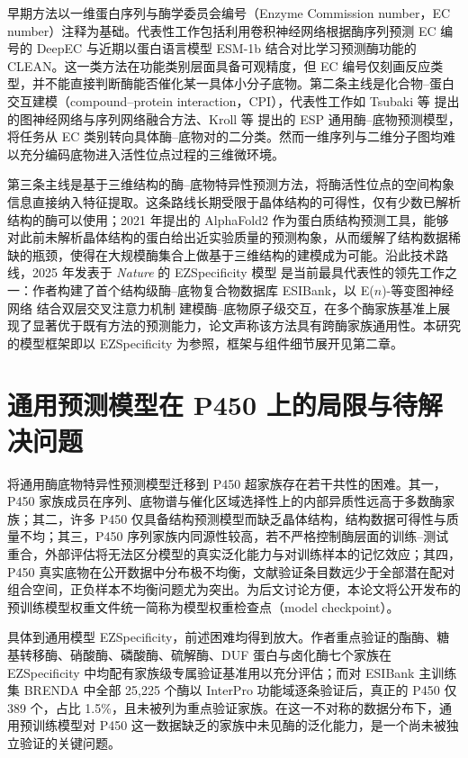 早期方法以一维蛋白序列与酶学委员会编号（Enzyme Commission number，EC number）注释为基础。代表性工作包括利用卷积神经网络根据酶序列预测 EC 编号的 DeepEC\cite{DeepEC2019} 与近期以蛋白语言模型 ESM-1b\cite{ESM2021} 结合对比学习预测酶功能的 CLEAN\cite{CLEAN2023}。这一类方法在功能类别层面具备可观精度，但 EC 编号仅刻画反应类型，并不能直接判断酶能否催化某一具体小分子底物。第二条主线是化合物--蛋白交互建模（compound--protein interaction，CPI），代表性工作如 Tsubaki 等\cite{CPI2019} 提出的图神经网络与序列网络融合方法、Kroll 等\cite{ESP2023} 提出的 ESP 通用酶--底物预测模型，将任务从 EC 类别转向具体酶--底物对的二分类。然而一维序列与二维分子图均难以充分编码底物进入活性位点过程的三维微环境。

第三条主线是基于三维结构的酶--底物特异性预测方法，将酶活性位点的空间构象信息直接纳入特征提取。这条路线长期受限于晶体结构的可得性，仅有少数已解析结构的酶可以使用；2021 年提出的 AlphaFold2\cite{AlphaFold2} 作为蛋白质结构预测工具，能够对此前未解析晶体结构的蛋白给出近实验质量的预测构象，从而缓解了结构数据稀缺的瓶颈，使得在大规模酶集合上做基于三维结构的建模成为可能。沿此技术路线，2025 年发表于 \textit{Nature} 的 EZSpecificity 模型\cite{EZSpec2025} 是当前最具代表性的领先工作之一：作者构建了首个结构级酶--底物复合物数据库 ESIBank，以 E($n$)-等变图神经网络\cite{EGNN2021} 结合双层交叉注意力机制\cite{Transformer2017} 建模酶--底物原子级交互，在多个酶家族基准上展现了显著优于既有方法的预测能力，论文声称该方法具有跨酶家族通用性。本研究的模型框架即以 EZSpecificity 为参照，框架与组件细节展开见第二章。

\section{通用预测模型在 P450 上的局限与待解决问题}
\label{sec:limitations}

将通用酶底物特异性预测模型迁移到 P450 超家族存在若干共性的困难\cite{Kirchmair2015}。其一，P450 家族成员在序列、底物谱与催化区域选择性上的内部异质性远高于多数酶家族；其二，许多 P450 仅具备结构预测模型而缺乏晶体结构，结构数据可得性与质量不均；其三，P450 序列家族内同源性较高，若不严格控制酶层面的训练--测试重合，外部评估将无法区分模型的真实泛化能力与对训练样本的记忆效应；其四，P450 真实底物在公开数据中分布极不均衡，文献验证条目数远少于全部潜在配对组合空间，正负样本不均衡问题尤为突出。为后文讨论方便，本论文将公开发布的预训练模型权重文件统一简称为模型权重检查点（model checkpoint）。

具体到通用模型 EZSpecificity，前述困难均得到放大。作者重点验证的酯酶、糖基转移酶、硝酸酶、磷酸酶、硫解酶、DUF 蛋白与卤化酶七个家族在 EZSpecificity 中均配有家族级专属验证基准用以充分评估；而对 ESIBank 主训练集 BRENDA 中全部 25{,}225 个酶以 InterPro\cite{Blum2025} 功能域逐条验证后，真正的 P450 仅 389 个，占比 1.5\%，且未被列为重点验证家族。在这一不对称的数据分布下，通用预训练模型对 P450 这一数据缺乏的家族中未见酶的泛化能力，是一个尚未被独立验证的关键问题。

